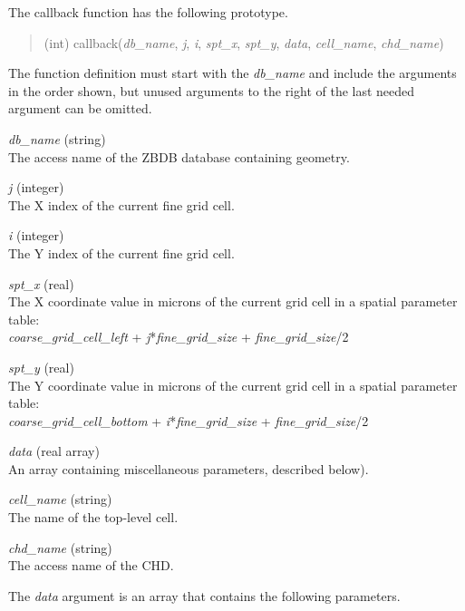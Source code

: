 \begin{description}
The callback function has the following prototype.
\begin{quote}
(int) {\vt callback}({\it db\_name\/}, {\it j\/}, {\it i\/},
{\it spt\_x\/}, {\it spt\_y\/}, {\it data}, {\it cell\_name}, {\it chd\_name})
\end{quote}
The function definition must start with the {\it db\_name} and include
the arguments in the order shown, but unused arguments to the right of
the last needed argument can be omitted.

\begin{description}
\item{\it db\_name} (string)\\
The access name of the ZBDB database containing geometry.

\item{\it j} (integer)\\
The X index of the current fine grid cell.

\item{\it i} (integer)\\
The Y index of the current fine grid cell.

\item{\it spt\_x} (real)\\
The X coordinate value in microns of the current grid cell in a spatial
parameter table:\\
{\it coarse\_grid\_cell\_left} + {\it j\/}*{\it fine\_grid\_size} +
 {\it fine\_grid\_size\/}{\vt /2}

\item{\it spt\_y} (real)\\
The Y coordinate value in microns of the current grid cell in a spatial
parameter table:\\
{\it coarse\_grid\_cell\_bottom} + {\it i\/}*{\it fine\_grid\_size} +
 {\it fine\_grid\_size}{\vt /2}

\item{\it data} (real array)\\
An array containing miscellaneous parameters, described below).

\item{\it cell\_name} (string)\\
The name of the top-level cell.

\item{\it chd\_name} (string)\\
The access name of the CHD.
\end{description}

The {\it data} argument is an array that contains the following
parameters.


\end{description}
